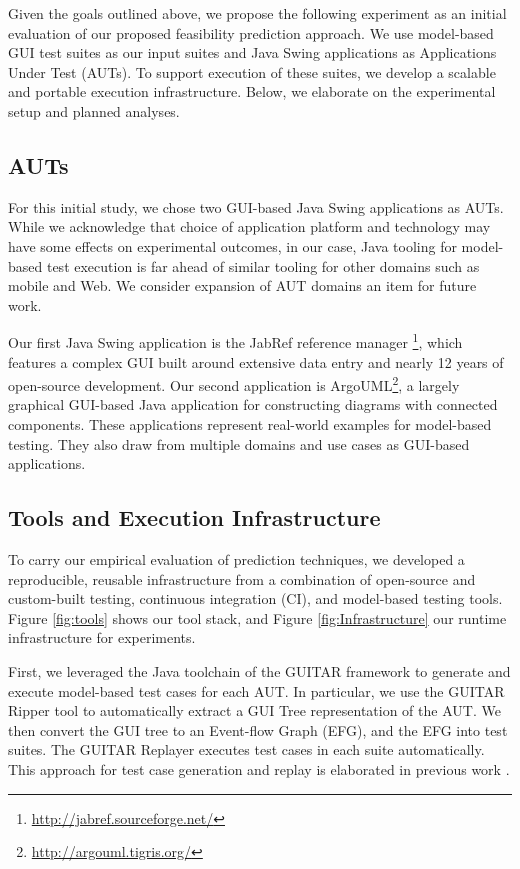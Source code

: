 Given the goals outlined above, we propose the following experiment as an
initial evaluation of our proposed feasibility prediction approach. We use
model-based GUI test suites as our input suites and Java Swing applications as
Applications Under Test (AUTs). To support execution of these suites, we
develop a scalable and portable execution infrastructure. Below, we elaborate
on the experimental setup and planned analyses.

\subsection{ AUTs }

For this initial study, we chose two GUI-based Java Swing applications as
AUTs. While we acknowledge that choice of application platform and technology
may have some effects on experimental outcomes, in our case, Java tooling
for model-based test execution is far ahead of similar tooling for other
domains such as mobile and Web. We consider expansion of AUT domains an item
for future work.

Our first Java Swing application is the JabRef reference manager
\footnote{\url{http://jabref.sourceforge.net/}}, which features a complex
GUI built around extensive data entry and nearly 12 years of
open-source development. Our second application is
ArgoUML\footnote{\url{http://argouml.tigris.org/}}, a largely graphical
GUI-based Java application for constructing diagrams with connected
components. These applications represent real-world examples for model-based
testing. They also draw from multiple domains and use cases as GUI-based
applications.

\subsection{ Tools and Execution Infrastructure }





To carry our empirical evaluation of prediction techniques, we developed a reproducible,
reusable infrastructure from a combination of open-source and custom-built testing, continuous
integration (CI), and model-based testing tools. Figure \ref{fig:tools} shows our tool stack, and
Figure \ref{fig:Infrastructure} our runtime infrastructure for experiments.

First, we leveraged the Java toolchain of the GUITAR framework to generate and execute 
model-based test cases for each AUT. In particular, we use the GUITAR Ripper tool to
automatically extract a GUI Tree representation of the AUT. We then convert the GUI tree
to an Event-flow Graph (EFG), and the EFG into test suites. The GUITAR Replayer executes
test cases in each suite automatically. This approach for test case generation and replay is
elaborated in previous work \cite{XXX}.

